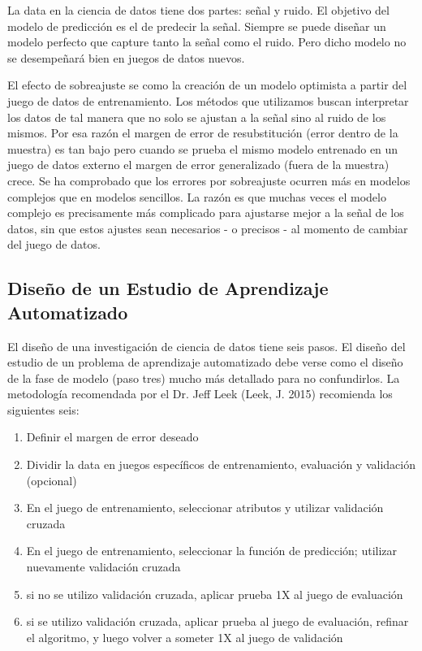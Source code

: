 \begin{spacing}{1.5}
La data en la ciencia de datos tiene dos partes: señal y ruido. El objetivo del modelo de predicción es el de predecir la señal. Siempre se puede diseñar un modelo perfecto que capture tanto la señal como el ruido. Pero dicho modelo no se desempeñará bien en juegos de datos nuevos. 

El efecto de sobreajuste se como la creación de un modelo optimista a partir del juego de datos de entrenamiento. Los métodos que utilizamos buscan interpretar los datos de tal manera que no solo se ajustan a la señal sino al ruido de los mismos. Por esa razón el margen de error de resubstitución (error dentro de la muestra) es tan bajo pero cuando se prueba el mismo modelo entrenado en un juego de datos externo el margen de error generalizado (fuera de la muestra) crece. Se ha comprobado que los errores por sobreajuste ocurren más en modelos complejos que en modelos sencillos. La razón es que muchas veces el modelo complejo es precisamente más complicado para ajustarse mejor a la señal de los datos, sin que estos ajustes sean necesarios - o precisos - al momento de cambiar del juego de datos. 

\subsection{Diseño de un Estudio de Aprendizaje Automatizado}
El diseño de una investigación de ciencia de datos tiene seis pasos. El diseño del estudio de un problema de aprendizaje automatizado debe verse como el diseño de la fase de modelo (paso tres) mucho más detallado para no confundirlos. La metodología recomendada por el Dr. Jeff Leek (Leek, J. 2015) recomienda los siguientes seis:

\begin{enumerate}
	\item Definir el margen de error deseado
	\item Dividir la data en juegos específicos de entrenamiento, evaluación y validación (opcional)
	\item En el juego de entrenamiento, seleccionar atributos y utilizar validación cruzada
	\item En el juego de entrenamiento, seleccionar la función de predicción; utilizar nuevamente validación cruzada
	\item si no se utilizo validación cruzada, aplicar prueba 1X al juego de evaluación
	\item si se utilizo validación cruzada, aplicar prueba al juego de evaluación, refinar el algoritmo, y luego volver a someter 1X al juego de validación 
\end{enumerate}


\end{spacing}
